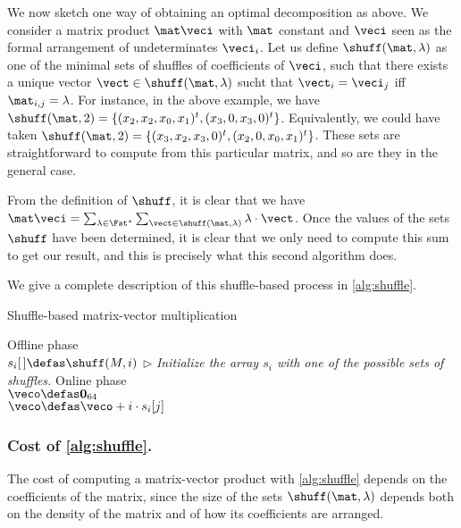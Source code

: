 \medskip

We now sketch one way of obtaining an optimal decomposition as above.
We consider a matrix product $\mat\veci$ with $\mat$ constant and $\veci$
seen as the formal arrangement of undeterminates $\veci_i$.
Let us define $\shuff(\mat, \lambda)$ as one of the minimal sets of shuffles of coefficients of $\veci$, such that
there exists a unique vector $\vect \in \shuff(\mat, \lambda)$ sucht that $\vect_i = \veci_j$ iff $\mat_{i,j} = \lambda$.
For instance, in the above example, we have $\shuff(\mat,2) = \{(x_2,x_2,x_0,x_1)^t, (x_3,0,x_3,0)^t\}$. Equivalently, we could have taken
$\shuff(\mat, 2) = \{(x_3,x_2,x_3,0)^t, (x_2,0,x_0,x_1)^t\}$.
These sets are straightforward to compute from this particular matrix, and so are they in the general case.

From the definition of $\shuff$, it is clear that we have $\mat\veci = \sum_{\lambda \in \Fst^*}\sum_{\vect \in \shuff(\mat,\lambda)} \lambda\cdot \vect$.
Once the values of the sets $\shuff$ have been determined, it is clear that we only need to compute this sum to get our result, and 
this is precisely what this second algorithm does.

We give a complete description of this shuffle-based process in \autoref{alg:shuffle}.

\begin{algorithm}[!h]
  \caption{Shuffle-based matrix-vector multiplication}
\label{alg:shuffle}
  \LinesNumbered
  \KwOut{  $\veco = \mat\cdot\veci$}
  Offline phase\\
  {
  $s_i[\,] \defas \shuff(M, i)$ $\triangleright$ \emph{Initialize the array $s_i$ with one of the possible sets of shuffles.}
  }
  Online phase\\
  $\veco \defas \mathbf{0}_{64}$\\
  {
  {
  $\veco \defas \veco + i\cdot s_i[j]$
  }
  }
  \Return{$\veco$}
\end{algorithm}

\subsubsection{Cost of \autoref{alg:shuffle}.} The cost of computing a matrix-vector product with \autoref{alg:shuffle} depends
on the coefficients of the matrix, since the size of the sets $\shuff(\mat, \lambda)$ depends both on the density
of the matrix and of how its coefficients are arranged.

